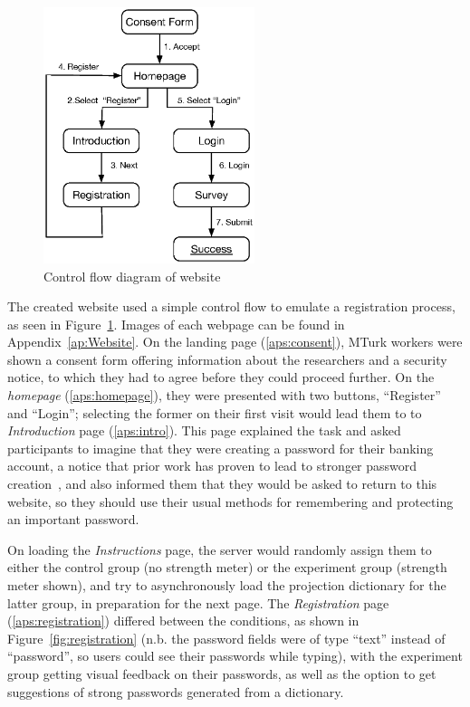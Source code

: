     \begin{figure}[htpb]
      \centering
      \includegraphics[width=0.55\textwidth]{Images/control_flow}
      \caption{Control flow diagram of website}
      \label{fig:control_flow}
    \end{figure}

    The created website used a simple control flow to emulate a registration process, as seen in Figure~\ref{fig:control_flow}. Images of each webpage can be found in Appendix~\ref{ap:Website}. On the landing page (\ref{aps:consent}), MTurk workers were shown a consent form offering information about the researchers and a security notice, to which they had to agree before they could proceed further. On the \emph{homepage} (\ref{aps:homepage}), they were presented with two buttons, ``Register'' and ``Login''; selecting the former on their first visit would lead them to to \emph{Introduction} page (\ref{aps:intro}). This page explained the task and asked participants to imagine that they were creating a password for their banking account, a notice that prior work has proven to lead to stronger password creation~\cite{pass_policy_new}, and also informed them that they would be asked to return to this website, so they should use their usual methods for remembering and protecting an important password.

    On loading the \emph{Instructions} page, the server would randomly assign them to either the control group (no strength meter) or the experiment group (strength meter shown), and try to asynchronously load the projection dictionary for the latter group, in preparation for the next page. The \emph{Registration} page (\ref{aps:registration}) differed between the conditions, as shown in Figure~\ref{fig:registration} (n.b. the password fields were of type ``text'' instead of ``password'', so users could see their passwords while typing), with the experiment group getting visual feedback on their passwords, as well as the option to get suggestions of strong passwords generated from a dictionary.

